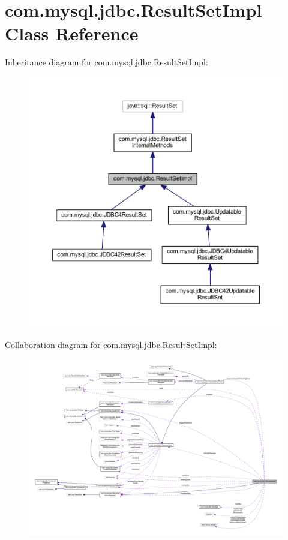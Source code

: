 \hypertarget{classcom_1_1mysql_1_1jdbc_1_1_result_set_impl}{}\section{com.\+mysql.\+jdbc.\+Result\+Set\+Impl Class Reference}
\label{classcom_1_1mysql_1_1jdbc_1_1_result_set_impl}


Inheritance diagram for com.\+mysql.\+jdbc.\+Result\+Set\+Impl\+:
\nopagebreak
\begin{figure}[H]
\begin{center}
\leavevmode
\includegraphics[width=350pt]{classcom_1_1mysql_1_1jdbc_1_1_result_set_impl__inherit__graph}
\end{center}
\end{figure}


Collaboration diagram for com.\+mysql.\+jdbc.\+Result\+Set\+Impl\+:
\nopagebreak
\begin{figure}[H]
\begin{center}
\leavevmode
\includegraphics[width=350pt]{classcom_1_1mysql_1_1jdbc_1_1_result_set_impl__coll__graph}
\end{center}
\end{figure}
